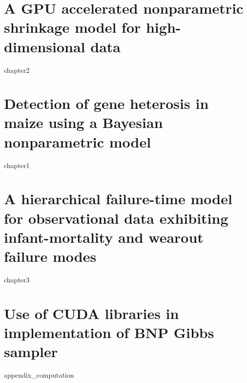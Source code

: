 \documentclass[11pt]{isuthesis}
\begin{document}


\tableofcontents
{} \cleardoublepage {}
{}
\listoftables
\cleardoublepage {} {}
\listoffigures

\newtoggle{thesis}
\toggletrue{thesis}

\cleardoublepage {}  %
\cleardoublepage {}         %



\newpage
{}



\chapter{A GPU accelerated nonparametric shrinkage
model for high-dimensional data}
{chapter2}

\chapter{Detection of gene heterosis in maize using a Bayesian nonparametric model}
{chapter1}

\chapter{A hierarchical failure-time model for observational data exhibiting infant-mortality and wearout failure modes}
{chapter3}


\appendixtitle
\appendix

\chapter{Use of CUDA libraries in implementation of BNP Gibbs sampler}
{appendix_computation}
\end{document}
